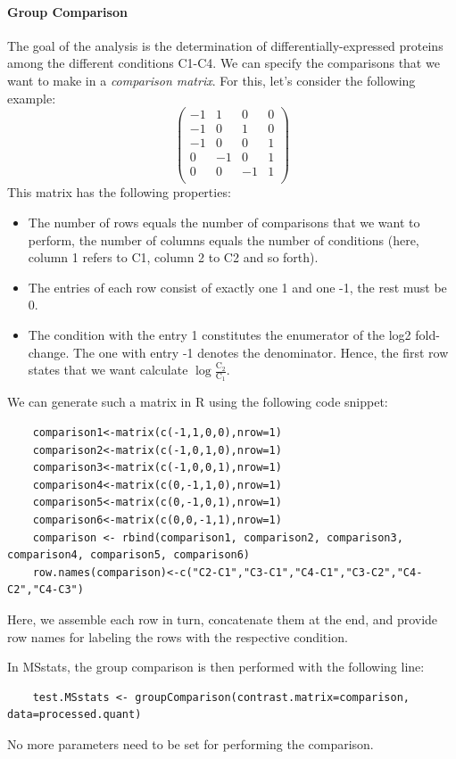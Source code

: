 \paragraph{Group Comparison}
The goal of the analysis is the determination of differentially-expressed
proteins among the different conditions C1-C4.
We can specify the comparisons that we want to make in a
\emph{comparison matrix}. For this, let's consider the following example:
\begin{equation}
	\begin{pmatrix}
	-1 & 1  & 0 & 0 \\
	-1 & 0  & 1 & 0 \\
	-1 & 0  & 0 & 1 \\
	 0 & -1 & 0 & 1 \\
	 0 & 0  & -1 & 1 \\
	\end{pmatrix}
\end{equation}
This matrix has the following properties:
\begin{itemize}
	\item
	The number of rows equals the number of comparisons that we want to
	perform, the number of columns equals the number of conditions
	(here, column 1 refers to C1, column 2 to C2 and so forth).
	\item 
	The entries of each row consist of exactly one 1 and one -1, the
	rest must be 0.
	\item 
	The condition with the entry 1 constitutes the enumerator
	of the log2 fold-change. The one with entry -1 denotes the 
	denominator.
	Hence, the first row states that we want calculate
	$\log \frac{\text{C}_2}{\text{C}_1}$.
\end{itemize}

We can generate such a matrix in R using the following code snippet:
\begin{lstlisting}
	comparison1<-matrix(c(-1,1,0,0),nrow=1)
	comparison2<-matrix(c(-1,0,1,0),nrow=1)
	comparison3<-matrix(c(-1,0,0,1),nrow=1)
	comparison4<-matrix(c(0,-1,1,0),nrow=1)
	comparison5<-matrix(c(0,-1,0,1),nrow=1)
	comparison6<-matrix(c(0,0,-1,1),nrow=1)
	comparison <- rbind(comparison1, comparison2, comparison3, comparison4, comparison5, comparison6)
	row.names(comparison)<-c("C2-C1","C3-C1","C4-C1","C3-C2","C4-C2","C4-C3")
\end{lstlisting}
Here, we assemble each row in turn, concatenate them at the end, and provide row names for labeling
the rows with the respective condition.

In MSstats, the group comparison is then performed with the following line:
\begin{lstlisting}
	test.MSstats <- groupComparison(contrast.matrix=comparison, data=processed.quant)
\end{lstlisting}
No more parameters need to be set for performing the comparison.

